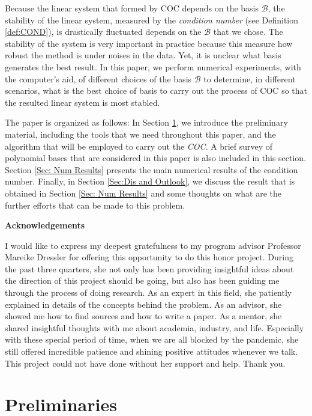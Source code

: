 \documentclass[12pt]{amsart}
\numberwithin{equation}{section}
\theoremstyle{definition}
\numberwithin{thm}{section}
\begin{document}
Because the linear system that formed by COC depends on the basis $\mathcal{B}$,
the stability of the linear system, measured by the \emph{condition number} (see Definition \ref{def:COND}), 
is drastically fluctuated depends on the $\mathcal{B}$ that we chose. 
The stability of the system is very important in practice because this measure how robust the method is under noises in the data.
Yet, it is unclear what basis generates the best result.
In this paper, we perform numerical experiments, with the computer's aid, of different choices of the basis $\mathcal{B}$ to determine, 
in different scenarios, what is the best choice of basis to carry out the process of COC so that the resulted linear system is most stabled. 

The paper is organized as follows: In Section \ref{Sec:Preliminaries}, we introduce the preliminary material, 
including the tools that we need throughout this paper, and the algorithm that will be employed to carry out the \emph{COC}.
A brief survey of polynomial bases that are considered in this paper is also included in this section. 
Section \ref{Sec: Num Results} presents the main numerical results of the condition number. 
Finally, in Section \ref{Sec:Dis and Outlook}, we discuss the result that is obtained in Section \ref{Sec: Num Results} and some thoughts on what are the further efforts that can be made to this problem.



\newpage

\centerline{\textbf{Acknowledgements}}

I would like to express my deepest gratefulness to my program advisor Professor Mareike Dressler for offering this opportunity to do this honor project. 
During the past three quarters, she not only has been providing insightful ideas about the direction of this project should be going, 
but also has been guiding me through the process of doing research. 
As an expert in this field, she patiently explained in details of the concepts behind the problem.
As an advisor, she showed me how to find sources and how to write a paper. 
As a mentor, she shared insightful thoughts with me about academia, industry, and life.
Especially with these special period of time, when we are all blocked by the pandemic, 
she still offered incredible patience and shining positive attitudes whenever we talk. 
This project could not have done without her support and help. 
Thank you.

\newpage

\section{Preliminaries}
\label{Sec:Preliminaries}
\end{document}
